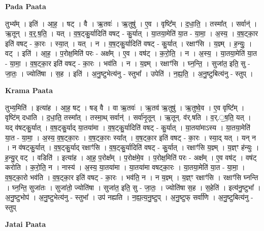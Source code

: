 \documentclass[17pt]{extarticle}
\begin{document}
\textbf{Pada Paata} \newline

तुभ्य᳚म् । इति॑ । आ॒ह॒ । षट् । वै । ऋ॒तवः॑ । ऋ॒तुषु॑ । ए॒व । वृष्टि᳚म् । द॒धा॒ति॒ । तस्मा᳚त् । सर्वान्॑ । ऋ॒तून् । व॒र्॒.ष॒ति॒ । यत् । व॒ष॒ट्कु॒र्यादिति॑ वषट् - कु॒र्यात् । या॒तया॒मेति॑ या॒त - या॒मा॒ । अ॒स्य॒ । व॒ष॒ट्का॒र इति॑ वषट् - का॒रः । स्या॒त् । यत् । न । व॒ष॒ट्कु॒र्यादिति॑ वषट् - कु॒र्यात् । रक्षाꣳ॑सि । य॒ज्ञ्म् । ह॒न्युः॒ । वट् । इति॑ । आ॒ह॒ । प॒रोक्ष॒मिति॑ परः - अक्ष᳚म् । ए॒व । वष॑ट् । क॒रो॒ति॒ । न । अ॒स्य॒ । या॒तया॒मेति॑ या॒त - या॒मा॒ । व॒ष॒ट्का॒र इति॑ वषट् - का॒रः । भव॑ति । न । य॒ज्ञ्म् । रक्षाꣳ॑सि । घ्न॒न्ति॒ । सुजा॑त॒ इति॒ सु - जा॒तः॒ । ज्योति॑षा । स॒ह । इति॑ । अ॒नु॒ष्टुभेत्य॑नु - स्तुभा᳚ । उपेति॑ । न॒ह्य॒ति॒ । अ॒नु॒ष्टुबित्य॑नु - स्तुप् ।  \newline


\textbf{Krama Paata} \newline

तुभ्य॒मिति॑ । इत्या॑ह । आ॒ह॒ षट् । षड् वै । वा ऋ॒तवः॑ । ऋ॒तव॑ ऋ॒तुषु॑ । ऋ॒तुष्वे॒व । ए॒व वृष्टि᳚म् । वृष्टि॑म् दधाति । द॒धा॒ति॒ तस्मा᳚त् । तस्मा॒थ् सर्वान्॑ । सर्वा॑नृ॒तून् । ऋ॒तून्. व॑र्.षति । व॒र्.॒ष॒ति॒ यत् । यद् व॑षट्कु॒र्यात् । व॒ष॒ट्कु॒र्याद् या॒तया॑मा । व॒ष॒ट्कु॒र्यादिति॑ वषट् - कु॒र्यात् । या॒तया॑माऽस्य । या॒तया॒मेति॑ या॒त - या॒मा॒ । अ॒स्य॒ व॒ष॒ट्का॒रः । व॒ष॒ट्का॒रः स्या᳚त् । व॒ष॒ट्का॒र इति॑ वषट् - का॒रः । स्या॒द् यत् । यन् न । न व॑षट्कु॒र्यात् । व॒ष॒ट्कु॒र्याद् रक्षाꣳ॑सि । व॒ष॒ट्कु॒र्यादिति॑ वषट् - कु॒र्यात् । रक्षाꣳ॑सि य॒ज्ञ्म् । य॒ज्ञ्ꣳ ह॑न्युः । ह॒न्यु॒र् वट् । वडिति॑ । इत्या॑ह । आ॒ह॒ प॒रोक्ष᳚म् । प॒रोक्ष॑मे॒व । प॒रोक्ष॒मिति॑ परः - अक्ष᳚म् । ए॒व वष॑ट् । वष॑ट् करोति । क॒रो॒ति॒ न । नास्य॑ । अ॒स्य॒ या॒तया॑मा । या॒तया॑मा वषट्का॒रः । या॒तया॒मेति॑ या॒त - या॒मा॒ । व॒ष॒ट्का॒रो भव॑ति । व॒ष॒ट्का॒र इति॑ वषट् - का॒रः । भव॑ति॒ न । न य॒ज्ञ्म् । य॒ज्ञ्ꣳ रक्षाꣳ॑सि । रक्षाꣳ॑सि घ्नन्ति । घ्न॒न्ति॒ सुजा॑तः । सुजा॑तो॒ ज्योति॑षा । सुजा॑त॒ इति॒ सु - जा॒तः॒ । ज्योति॑षा स॒ह । स॒हेति॑ । इत्य॑नु॒ष्टुभा᳚ । अ॒नु॒ष्टुभोप॑ । अ॒नु॒ष्टुभेत्य॑नु - स्तुभा᳚ । उप॑ नह्यति । न॒ह्य॒त्य॒नु॒ष्टुप् । अ॒नु॒ष्टुफ् सर्वा॑णि । अ॒नु॒ष्टुबित्य॑नु - स्तुप् \newline

\textbf{Jatai Paata} \newline
\end{document}

